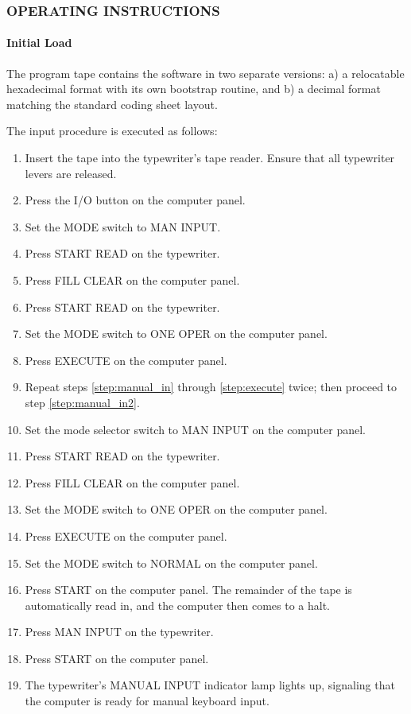 \subsubsection*{OPERATING INSTRUCTIONS}
\paragraph{Initial Load}

The program tape contains the software in two separate versions: a) a relocatable hexadecimal format with its own bootstrap routine, and b) a decimal format matching the standard coding sheet layout.

The input procedure is executed as follows:

\begin{enumerate}[label=\alph*)]
    \item \label{step:insert} Insert the tape into the typewriter's tape reader. Ensure that all typewriter levers are released.
    \item \label{step:io_button} Press the \textsf{I/O} button on the computer panel.
    \item \label{step:manual_in} Set the \textsf{MODE} switch to \textsf{MAN INPUT}.
    \item \label{step:start_read1} Press \textsf{START READ} on the typewriter.
    \item \label{step:fill_clear1} Press \textsf{FILL CLEAR} on the computer panel.
    \item \label{step:start_read2} Press \textsf{START READ} on the typewriter.
    \item \label{step:single_op} Set the \textsf{MODE} switch to \textsf{ONE OPER} on the computer panel.
    \item \label{step:execute} Press \textsf{EXECUTE} on the computer panel.
    \item Repeat steps \ref{step:manual_in} through \ref{step:execute} twice; then proceed to step \ref{step:manual_in2}.
    \item \label{step:manual_in2} Set the mode selector switch to \textsf{MAN INPUT} on the computer panel.
    \item Press \textsf{START READ} on the typewriter.
    \item Press \textsf{FILL CLEAR} on the computer panel.
    \item Set the \textsf{MODE} switch to \textsf{ONE OPER} on the computer panel.
    \item Press \textsf{EXECUTE} on the computer panel.
    \item Set the \textsf{MODE} switch to \textsf{NORMAL} on the computer panel.
    \item Press \textsf{START} on the computer panel. The remainder of the tape is automatically read in, and the computer then comes to a halt.
    \item Press \textsf{MAN INPUT} on the typewriter.
    \item \label{step:execute-rest} Press \textsf{START} on the computer panel.
    \item The typewriter's \textsf{MANUAL INPUT} indicator lamp lights up, signaling that the computer is ready for manual keyboard input.
\end{enumerate}

